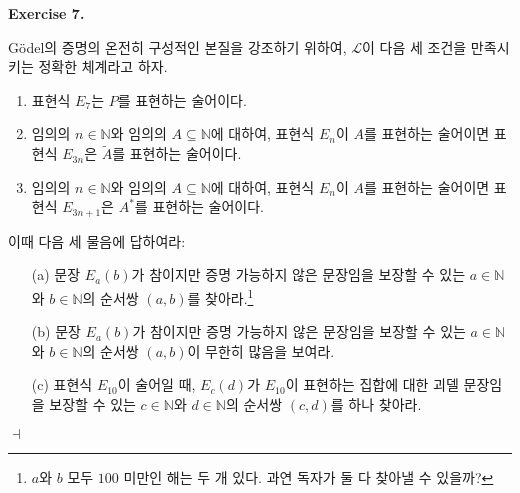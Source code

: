 \documentclass[12pt]{paper}
\newenvironment{context}[1][]
{ \noindent \textbf{{#1}.}
}
{ \hfill $ \dashv $ }
\begin{document}
\begin{context}[Exercise 7]
G\"odel의 증명의 온전히 구성적인 본질을 강조하기 위하여,
$\mathcal{L}$이 다음 세 조건을 만족시키는 정확한 체계라고 하자.
\begin{enumerate}
\item 표현식 $E_{7}$는 $P$를 표현하는 술어이다.
\item 임의의 $n \in \mathbb{N}$와 임의의 $A \subseteq \mathbb{N}$에 대하여, 표현식 $E_{n}$이 $A$를 표현하는 술어이면 표현식 $E_{3 n}$은 $\widetilde{A}$를 표현하는 술어이다.
\item 임의의 $n \in \mathbb{N}$와 임의의 $A \subseteq \mathbb{N}$에 대하여, 표현식 $E_{n}$이 $A$를 표현하는 술어이면 표현식 $E_{3 n + 1}$은 $A^{*}$를 표현하는 술어이다.
\end{enumerate}

이때 다음 세 물음에 답하여라:
\begin{itemize}
\item[(a)] 문장 $E_{a} \left( b \right)$가 참이지만 증명 가능하지 않은 문장임을 보장할 수 있는 $a \in \mathbb{N}$와 $b \in \mathbb{N}$의 순서쌍 $\left( a , b \right)$를 찾아라.\footnote
{
$a$와 $b$ 모두 $100$ 미만인 해는 두 개 있다.
과연 독자가 둘 다 찾아낼 수 있을까?
}
\item[(b)] 문장 $E_{a} \left( b \right)$가 참이지만 증명 가능하지 않은 문장임을 보장할 수 있는 $a \in \mathbb{N}$와 $b \in \mathbb{N}$의 순서쌍 $\left( a , b \right)$이 무한히 많음을 보여라.
\item[(c)] 표현식 $E_{10}$이 술어일 때, $E_{c} \left( d \right)$가 $E_{10}$이 표현하는 집합에 대한 괴델 문장임을 보장할 수 있는 $c \in \mathbb{N}$와 $d \in \mathbb{N}$의 순서쌍 $\left( c , d \right)$를 하나 찾아라.
\end{itemize}
\end{context}
\end{document}

